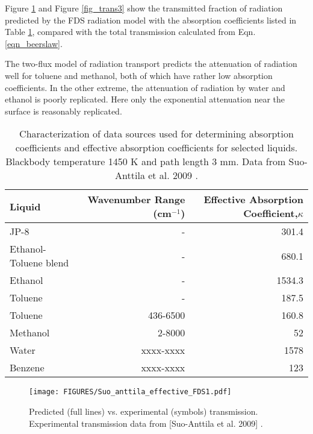 Figure \ref{fig_trans2} and Figure \ref{fig_trans3} show the transmitted fraction of radiation predicted by the FDS radiation model with the absorption coefficients listed in Table \ref{tbl_abscoeff}, compared with the total transmission calculated from Eqn. \ref{eqn_beerslaw}.

The two-flux model of radiation transport predicts the attenuation of radiation well for toluene and methanol, both of which have rather low absorption coefficients. In the other extreme, the attenuation of radiation by water and ethanol is poorly replicated. Here only the exponential attenuation near the surface is reasonably replicated.

\begin{table}[ht]
\caption{Characterization of data sources used for determining absorption coefficients and effective absorption coefficients for selected liquids. Blackbody temperature 1450 K and path length 3 mm. Data from Suo-Anttila et al. 2009 \cite{Suo-Anttila:PCT2009}.}
\centering
\begin{tabular}{l r r}
\hline\hline
Liquid & Wavenumber Range (cm$^{-1}$) & Effective Absorption Coefficient,$\kappa$ \\ [0.5ex]
\hline
JP-8                                 &  -          & 301.4   \\
Ethanol-Toluene blend                &  -          & 680.1   \\
Ethanol                              &  -          & 1534.3  \\
Toluene \cite{Suo-Anttila:PCT2009}   &  -          & 187.5   \\
Toluene \cite{Bertie:AS1994a}        &  436-6500   & 160.8   \\
Methanol                             &  2-8000     & 52      \\
Water                                &  xxxx-xxxx  & 1578    \\
Benzene                              &  xxxx-xxxx  & 123     \\
\hline
\end{tabular}
\label{tbl_abscoeff}
\end{table}

\begin{figure}[ht]
    \centering
    \texttt{[image: FIGURES/Suo\_anttila\_effective\_FDS1.pdf]}
    \caption{Predicted (full lines) vs. experimental (symbols) transmission.  Experimental transmission data from [Suo-Anttila et al. 2009] \cite{Suo-Anttila:PCT2009}.}
    \label{fig_trans2}
\end{figure}

